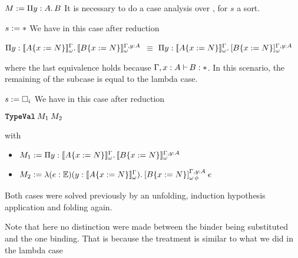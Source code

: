 \begin{Proof}
\begin{ProofCase}{$M \termDef \depArrow{y}{A}{B}$}
It is necessary to do a case analysis over ,
for $s$ a sort.
\begin{SubProofCase}{$s := \ast$}
We have in this case after reduction
\begin{center}
$\depArrow{y}{\WTypeTrans{\subst{A}{x}{N}}}{\WTypeTrans[\typing{y}{A}]{\subst{B}{x}{N}}}$
$\equiv$
$\depArrow{y}{\WTypeTrans{\subst{A}{x}{N}}}{\WTrans[\typing{y}{A}]{\subst{B}{x}{N}}}$
\end{center}
where the last equivalence holds because $\ctyping[\typing{x}{A}]{B}{\Prop}$. In this scenario,
the remaining of the subcase is equal to the lambda case.
\end{SubProofCase}

\begin{SubProofCase}{$s \termDef \Type$}
We have in this case after reduction
\begin{center}
$\app{\TypeVal}{M_1}{M_2}$
\end{center}
with
\begin{itemize}
\item $M_1 \termDef \depArrow{y}{\WTypeTrans{\subst{A}{x}{N}}}{
                            \WTypeTrans[\typing{y}{A}]{\subst{B}{x}{N}}}$
\item $M_2 \termDef \abs{e}{\ExceptionType}{y}{\WTypeTrans{\subst{A}{x}{N}}}{
                            \app{\WTransErr[\typing{y}{A}]{\subst{B}{x}{N}}}{e}}$
\end{itemize}
Both cases were solved previously by an unfolding, induction 
hypothesis application and folding again.
\end{SubProofCase}
Note that here no distinction were made between the binder being substituted and the one binding.
That is because the treatment is similar to what we did in the lambda case
\end{ProofCase}
\end{Proof}